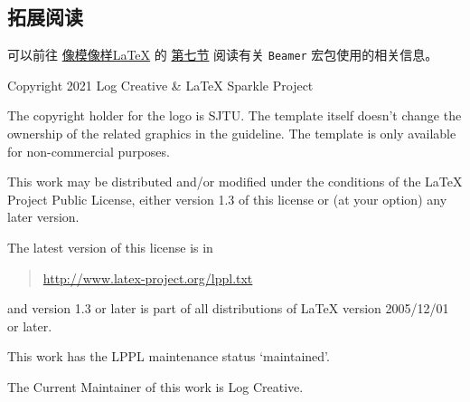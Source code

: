 \documentclass[a4paper,12pt]{article}
\begin{document}
\begin{CJK}{UTF8}{song}
\section{拓展阅读}
可以前往 \href{https://logcreative.github.io/LaTeXSparkle/}{像模像样\LaTeX} 的 \href{https://logcreative.github.io/LaTeXSparkle/src/art/chapter07.html}{第七节} 阅读有关 \verb"Beamer" 宏包使用的相关信息。

\scriptsize  

\newpage
Copyright 2021 Log Creative \& \LaTeX{} Sparkle Project

The copyright holder for the logo is SJTU. The template itself doesn't change the ownership of the related graphics in the guideline. The template is only available for non-commercial purposes.

This work may be distributed and/or modified under the
conditions of the \LaTeX{} Project Public License, either version 1.3 of this license or (at your option) any later version.

The latest version of this license is in
\begin{quotation}
    \href{http://www.latex-project.org/lppl.txt}{http://www.latex-project.org/lppl.txt}
\end{quotation}
and version 1.3 or later is part of all distributions of \LaTeX{}
version 2005/12/01 or later.

This work has the LPPL maintenance status `maintained'.

The Current Maintainer of this work is Log Creative.

%

\end{CJK}
\end{document}
